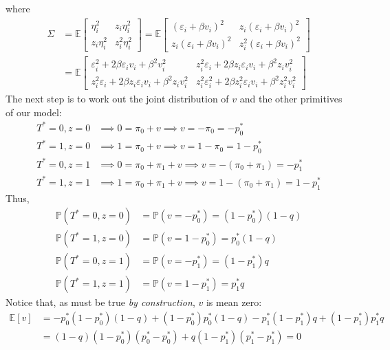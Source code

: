 \documentclass[12pt]{article}
\begin{document}
where
\begin{align*}
  \Sigma &= 
  \mathbb{E}\left[
  \begin{array}{cc}
   \eta_i^2 & z_i \eta_i^2\\
   z_i \eta_i^2 & z_i^2 \eta_i^2
  \end{array}
\right]
=
  \mathbb{E}\left[
  \begin{array}{cc}
   \left( \varepsilon_i + \beta v_i  \right)^2 & 
   z_i \left( \varepsilon_i + \beta v_i  \right)^2\\ 
   z_i \left( \varepsilon_i + \beta v_i  \right)^2 &
   z_i^2\left( \varepsilon_i + \beta v_i  \right)^2  
  \end{array}
\right]\\
&=
  \mathbb{E}\left[
  \begin{array}{cc}
   \varepsilon_i^2 + 2\beta \varepsilon_i v_i + \beta^2 v_i^2  & 
 z_i^2\varepsilon_i + 2\beta z_i \varepsilon_i v_i + \beta^2 z_i v_i^2 \\
   z_i^2\varepsilon_i + 2\beta z_i \varepsilon_i v_i + \beta^2 z_i v_i^2 &
   z_i^2\varepsilon_i^2 + 2\beta z_i^2 \varepsilon_i v_i + \beta^2 z_i^2 v_i^2  
  \end{array}
\right]
\end{align*}
The next step is to work out the joint distribution of $v$ and the other primitives of our model:
\begin{align*}
  T^*=0, z = 0 &\implies 0 = \pi_0 + v \implies v = -\pi_0 = -p_0^*\\
  T^*=1, z = 0 &\implies 1 = \pi_0 + v \implies v = 1-\pi_0 = 1-p_0^*\\
  T^*=0, z = 1 &\implies 0 = \pi_0 + \pi_1 + v \implies v = -(\pi_0 + \pi_1) = -p_1^*\\
  T^*=1, z = 1 &\implies 1 = \pi_0 + \pi_1 + v \implies v = 1-(\pi_0 + \pi_1) = 1-p_1^*
\end{align*}
Thus,
\begin{align*}
  \mathbb{P}(T^*=0, z = 0) &= \mathbb{P}(v = -p_0^*) = (1-p_0^*)(1-q)\\
  \mathbb{P}(T^*=1, z = 0) &= \mathbb{P}(v = 1-p_0^*) = p_0^*(1-q)\\
  \mathbb{P}(T^*=0, z = 1) &= \mathbb{P}(v = -p_1^*) = (1-p_1^*)q\\
  \mathbb{P}(T^*=1, z = 1) &= \mathbb{P}(v = 1-p_1^*) = p_1^* q 
\end{align*}
Notice that, as must be true \emph{by construction}, $v$ is mean zero:
\begin{align*}
  \mathbb{E}[v] &= -p_0^*(1-p_0^*)(1 - q) + (1 - p_0^*)p_0^*(1-q) - p_1^*(1-p_1^*)q + (1-p_1^*)p_1^*q  \\
  &= (1-q)(1 - p_0^*) (p_0^* - p_0^*) + q(1-p_1^*)(p_1^* - p_1^*) = 0
\end{align*}
\end{document}
